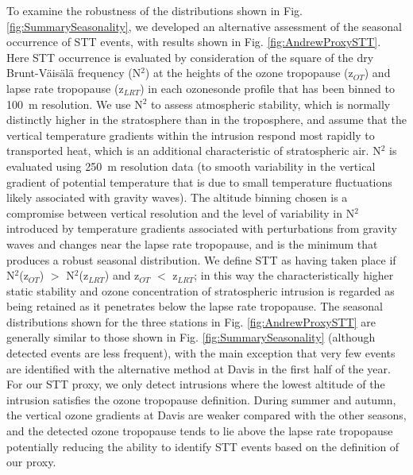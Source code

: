 \documentclass[acp, manuscript]{copernicus} %
\begin{document}
  To examine the robustness of the distributions shown in Fig. \ref{fig:SummarySeasonality}, we developed an alternative assessment of the seasonal occurrence of STT events, with results shown in Fig. \ref{fig:AndrewProxySTT}.
  Here STT occurrence is evaluated by consideration of the square of the dry Brunt-V\"{a}is\"{a}l\"{a} frequency (N$^2$) at the heights of the ozone tropopause (z$_{OT}$) and lapse rate tropopause (z$_{LRT}$) in each ozonesonde profile that has been binned to 100~m resolution.
  We use N$^2$ to assess atmospheric stability, which is normally distinctly higher in the stratosphere than in the troposphere, and assume that the vertical temperature gradients within the intrusion respond most rapidly to transported heat, which is an additional characteristic of stratospheric air.
  N$^2$ is evaluated using 250~m resolution data (to smooth variability in the vertical gradient of potential temperature that is due to small temperature fluctuations likely associated with gravity waves).
  The altitude binning chosen is a compromise between vertical resolution and the level of variability in N$^2$ introduced by temperature gradients associated with perturbations from gravity waves and changes near the lapse rate tropopause, and is the minimum that produces a robust seasonal distribution.
  We define STT as having taken place if N$^2$(z$_{OT}$) $>$ N$^2$(z$_{LRT}$) and z$_{OT}$ $<$ z$_{LRT}$; in this way the characteristically higher static stability and ozone concentration of stratospheric intrusion is regarded as being retained as it penetrates below the lapse rate tropopause. 
  The seasonal distributions shown for the three stations in Fig. \ref{fig:AndrewProxySTT} are generally similar to those shown in Fig. \ref{fig:SummarySeasonality} (although detected events are less frequent), with the main exception that very few events are identified with the alternative method at Davis in the first half of the year.
  For our STT proxy, we only detect intrusions where the lowest altitude of the intrusion satisfies the ozone tropopause definition. During summer and autumn, the vertical ozone gradients at Davis are weaker compared with the other seasons, and the detected ozone tropopause tends to lie above the lapse rate tropopause potentially reducing the ability to identify STT events based on the definition of our proxy.
\end{document}
